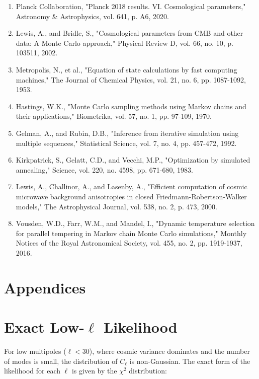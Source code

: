 \documentclass[11pt]{article}
\theoremstyle{definition}
\begin{document}
\begin{enumerate}
  \item Planck Collaboration, "Planck 2018 results. VI. Cosmological parameters," Astronomy \& Astrophysics, vol. 641, p. A6, 2020.
  
  \item Lewis, A., and Bridle, S., "Cosmological parameters from CMB and other data: A Monte Carlo approach," Physical Review D, vol. 66, no. 10, p. 103511, 2002.
  
  \item Metropolis, N., et al., "Equation of state calculations by fast computing machines," The Journal of Chemical Physics, vol. 21, no. 6, pp. 1087-1092, 1953.
  
  \item Hastings, W.K., "Monte Carlo sampling methods using Markov chains and their applications," Biometrika, vol. 57, no. 1, pp. 97-109, 1970.
  
  \item Gelman, A., and Rubin, D.B., "Inference from iterative simulation using multiple sequences," Statistical Science, vol. 7, no. 4, pp. 457-472, 1992.
  
  \item Kirkpatrick, S., Gelatt, C.D., and Vecchi, M.P., "Optimization by simulated annealing," Science, vol. 220, no. 4598, pp. 671-680, 1983.
  
  \item Lewis, A., Challinor, A., and Lasenby, A., "Efficient computation of cosmic microwave background anisotropies in closed Friedmann-Robertson-Walker models," The Astrophysical Journal, vol. 538, no. 2, p. 473, 2000.
  
  \item Vousden, W.D., Farr, W.M., and Mandel, I., "Dynamic temperature selection for parallel tempering in Markov chain Monte Carlo simulations," Monthly Notices of the Royal Astronomical Society, vol. 455, no. 2, pp. 1919-1937, 2016.
\end{enumerate}

\appendix
\section*{Appendices}
\renewcommand{\thesection}{A}
\section{Exact Low-$\ell$ Likelihood}

For low multipoles ($\ell < 30$), where cosmic variance dominates and the number of modes is small, the distribution of $C_\ell$ is non-Gaussian. The exact form of the likelihood for each $\ell$ is given by the $\chi^2$ distribution:
\end{document}
